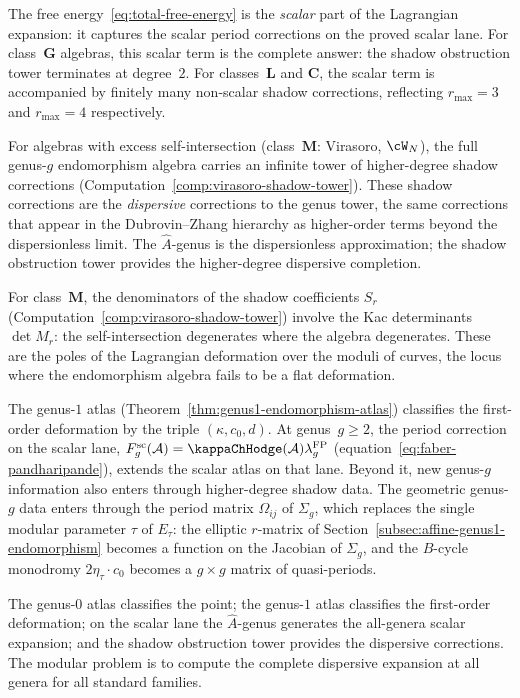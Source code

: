 \begin{remark}%
\label{rem:shadow-corrections-ahat}%
%
The free energy~\eqref{eq:total-free-energy} is the
\emph{scalar} part of the Lagrangian expansion: it
captures the scalar period corrections on the proved
scalar lane. For class~$\mathbf{G}$ algebras,
this scalar term is the complete answer: the shadow obstruction tower
terminates at degree~$2$. For classes~$\mathbf{L}$ and
$\mathbf{C}$, the scalar term is accompanied by finitely
many non-scalar shadow corrections, reflecting
$r_{\max}=3$ and $r_{\max}=4$ respectively.

For algebras with excess self-intersection
(class~$\mathbf{M}$: Virasoro, $\cW_N$), the full
genus-$g$ endomorphism algebra carries an infinite tower
of higher-degree shadow corrections
(Computation~\ref{comp:virasoro-shadow-tower}). These
shadow corrections are the \emph{dispersive}
corrections to the genus tower, the same corrections
that appear in the Dubrovin--Zhang hierarchy as
higher-order terms beyond the dispersionless limit.
The $\hat{A}$-genus is the dispersionless approximation;
the shadow obstruction tower provides the higher-degree dispersive
completion.

For class~$\mathbf{M}$, the denominators of the shadow
coefficients $S_r$
(Computation~\ref{comp:virasoro-shadow-tower}) involve the
Kac determinants $\det M_r$: the self-intersection
degenerates where the algebra degenerates. These
are the poles of the Lagrangian deformation over the
moduli of curves, the locus where the endomorphism
algebra fails to be a flat deformation.
\end{remark}

\begin{remark}%
\label{rem:atlas-continuation}%
%
The genus-$1$ atlas
(Theorem~\ref{thm:genus1-endomorphism-atlas}) classifies
the first-order deformation by the triple
$(\kappa, c_0, d)$. At genus~$g \ge 2$, the period
correction on the scalar lane,
$F_g^{\mathrm{sc}}(\cA)=\kappaChHodge(\cA)\lambda_g^{\mathrm{FP}}$
(equation~\eqref{eq:faber-pandharipande}),
extends the scalar atlas on that lane. Beyond it, new
genus-$g$ information also enters through higher-degree
shadow data. The geometric genus-$g$ data
enters through the period matrix $\Omega_{ij}$ of
$\Sigma_g$, which replaces the single modular parameter
$\tau$ of $E_\tau$: the elliptic $r$-matrix of
Section~\ref{subsec:affine-genus1-endomorphism} becomes
a function on the Jacobian of $\Sigma_g$, and the
$B$-cycle monodromy $2\eta_\tau \cdot c_0$ becomes a
$g \times g$ matrix of quasi-periods.

The genus-$0$ atlas classifies the point;
the genus-$1$ atlas classifies the first-order
deformation; on the scalar lane the
$\hat{A}$-genus generates the all-genera scalar
expansion; and the shadow obstruction tower
provides the dispersive corrections. The modular
problem is to compute the complete dispersive
expansion at all genera for all standard families.
\end{remark}

